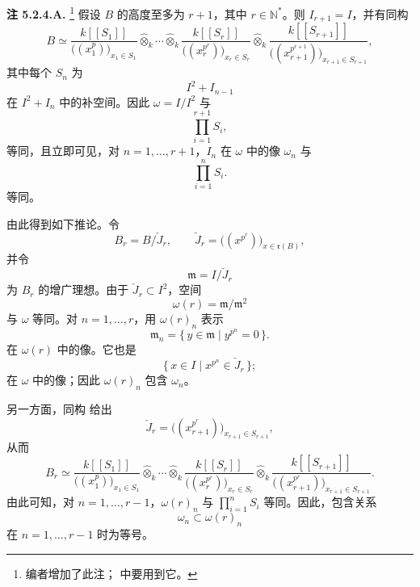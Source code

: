 
\medskip
\noindent\textbf{注 5.2.4.A.}
\label{sga3:VIIB:5.2.4.A}
\footnote{\label{sga3:VIIB:nde:161}编者增加了此注； 中要用到它。}
假设 \(B\) 的高度至多为 \(r+1\)，其中 \(r\in\mathbb N^*\)。则 \(I_{r+1}=I\)，并有同构
\[
\tag{1}\label{sga3:vii:remark:5-2-4-a:equation:1}
  B
  \simeq
  \frac{k[[S_1]]}{\bigl((x_1^p)\bigr)_{x_1\in S_1}}
  \widehat\otimes_k\cdots\widehat\otimes_k
  \frac{k[[S_r]]}{\bigl((x_r^{p^r})\bigr)_{x_r\in S_r}}
  \widehat\otimes_k
  \frac{k[[S_{r+1}]]}
       {\bigl((x_{r+1}^{p^{r+1}})\bigr)_{x_{r+1}\in S_{r+1}}},
\]
其中每个 \(S_n\) 为
\[
  I^2+I_{n-1}
\]
在 \(I^2+I_n\) 中的补空间。因此 \(\omega=I/I^2\) 与
\[
  \prod_{i=1}^{r+1}S_i,
\]
等同，且立即可见，对 \(n=1,\ldots,r+1\)，\(I_n\) 在 \(\omega\) 中的像 \(\omega_n\) 与
\[
  \prod_{i=1}^{n}S_i.
\]
等同。

由此得到如下推论。令
\[
  B_r=B/\check J_r,
  \qquad
  \check J_r
  =
  \bigl((x^{p^r})\bigr)_{x\in\mathfrak r(B)},
\]
并令
\[
  \mathfrak m=I/\check J_r
\]
为 \(B_r\) 的增广理想。由于 \(\check J_r\subset I^2\)，空间
\[
  \omega(r)=\mathfrak m/\mathfrak m^2
\]
与 \(\omega\) 等同。对 \(n=1,\ldots,r\)，用 \(\omega(r)_n\) 表示
\[
  \mathfrak m_n
  =
  \{\,y\in\mathfrak m\mid y^{p^n}=0\,\}.
\]
在 \(\omega(r)\) 中的像。它也是
\[
  \{\,x\in I\mid x^{p^n}\in\check J_r\,\};
\]
在 \(\omega\) 中的像；因此 \(\omega(r)_n\) 包含 \(\omega_n\)。

另一方面，同构 \textup{} 给出
\[
  \check J_r
  =
  \bigl((x_{r+1}^{p^r})\bigr)_{x_{r+1}\in S_{r+1}},
\]
从而
\[
\tag{2}\label{sga3:vii:remark:5-2-4-a:equation:2}
  B_r
  \simeq
  \frac{k[[S_1]]}{\bigl((x_1^p)\bigr)_{x_1\in S_1}}
  \widehat\otimes_k\cdots\widehat\otimes_k
  \frac{k[[S_r]]}{\bigl((x_r^{p^r})\bigr)_{x_r\in S_r}}
  \widehat\otimes_k
  \frac{k[[S_{r+1}]]}
       {\bigl((x_{r+1}^{p^r})\bigr)_{x_{r+1}\in S_{r+1}}}.
\]
由此可知，对 \(n=1,\ldots,r-1\)，\(\omega(r)_n\) 与 \(\prod_{i=1}^{n}S_i\) 等同。因此，包含关系
\[
  \omega_n\subset\omega(r)_n
\]
在 \(n=1,\ldots,r-1\) 时为等号。
